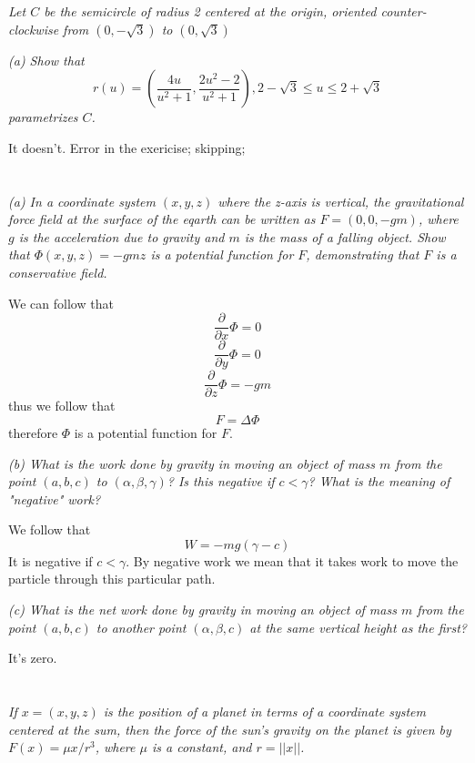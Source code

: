 \documentclass[11pt,oneside,titlepage]{book}
\begin{document}
\textit{Let $C$ be the semicircle of radius 2 centered at the origin, oriented
  counter-clockwise from $(0, -\sqrt{3})$ to $(0, \sqrt{3})$}

\textit{(a) Show that
  $$r(u) = \left(\frac{4u}{u^2 + 1}, \frac{2u^2 - 2}{u^2 + 1}\right),
  2 - \sqrt{3} \leq u \leq 2 + \sqrt{3}$$
parametrizes $C$. }

It doesn't. Error in the exericise; skipping;


\section{}

\textit{(a) In a coordinate system $(x, y, z)$ where the z-axis is vertical, the gravitational
  force field at the surface of the eqarth can be written as $F = (0, 0, -gm)$, where $g$ is the
  acceleration due to gravity and $m$ is the mass of a falling object. Show that $\Phi(x, y, z) =
  -gmz$ is a potential function for $F$, demonstrating that $F$ is a conservative field.}

We can follow that
$$\frac{\partial}{\partial x}\Phi = 0$$
$$\frac{\partial}{\partial y}\Phi = 0$$
$$\frac{\partial}{\partial z}\Phi = -gm$$
thus we follow that
$$F = \Delta \Phi$$
therefore $\Phi$ is a potential function for $F$.

\textit{(b) What is the work done by gravity in moving an object of mass $m$ from
  the point $(a, b, c)$ to $(\alpha, \beta, \gamma)$? Is this negative if $c < \gamma$?
  What is the meaning of "negative" work?}

We follow that
$$W = -mg(\gamma - c)$$
It is negative if $c < \gamma$. By negative work we mean that it takes work to move the particle
through this particular path.

\textit{(c) What is the net work done by gravity in moving an object of mass $m$ from the point
  $(a, b, c)$ to another point $(\alpha, \beta, c)$ at the same vertical height as the first? }

It's zero.

\section{}

\textit{If $x = (x, y, z)$ is the position of a planet in terms of a coordinate system
  centered at the sum, then the force of the sun's gravity on the planet is given by
  $F(x) = \mu x/r^3$, where $\mu$ is a constant, and $r = ||x||$.}
\end{document}
